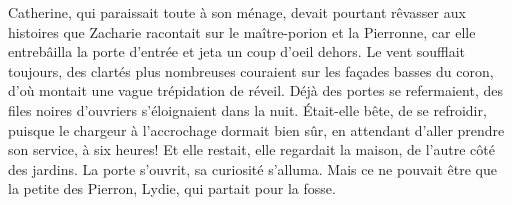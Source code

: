 Catherine, qui paraissait toute à son ménage, devait pourtant rêvasser
aux histoires que Zacharie racontait sur le maître-porion et la
Pierronne, car elle entrebâilla la porte d'entrée et jeta un coup
d'oeil dehors.  Le vent soufflait toujours, des clartés plus
nombreuses couraient sur les façades basses du coron, d'où montait une
vague trépidation de réveil.  Déjà des portes se refermaient, des
files noires d'ouvriers s'éloignaient dans la nuit.  Était-elle bête,
de se refroidir, puisque le chargeur à l'accrochage dormait bien sûr,
en attendant d'aller prendre son service, à six heures! Et elle
restait, elle regardait la maison, de l'autre côté des jardins.  La
porte s'ouvrit, sa curiosité s'alluma.  Mais ce ne pouvait être que la
petite des Pierron, Lydie, qui partait pour la fosse.